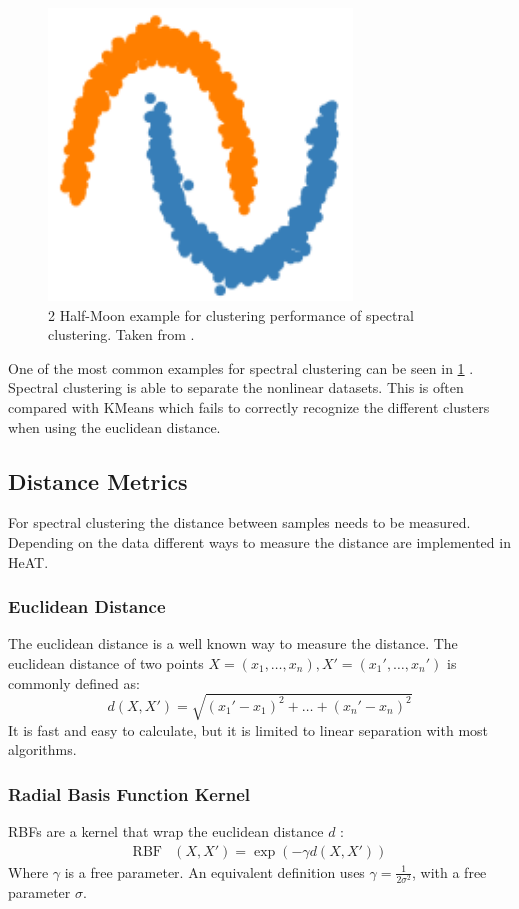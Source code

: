 \begin{figure}
  \includegraphics{images/spectral_example.png}
  \caption{2 Half-Moon example for clustering performance of spectral clustering. Taken from \cite{noauthor_23_2020}.}
  \label{fig:spectral_example}
\end{figure}

One of the most common examples for spectral clustering can be seen in \cref{fig:spectral_example} \cite{noauthor_23_2020}. Spectral clustering is able to
separate the nonlinear datasets. This is often compared with KMeans which fails to correctly recognize the different clusters when using the euclidean distance.

\subsection{Distance Metrics}
\label{subsec:distance_metrics}
For spectral clustering the distance between samples needs to be measured. Depending on the data different ways to measure the distance are implemented in \gls{HeAT}.

\subsubsection{Euclidean Distance}
The euclidean distance is a well known way to measure the distance. The euclidean distance of two points \(X = (x_1, \ldots, x_n ), X' = (x_1', \ldots, x_n')\) is commonly defined  as:
\[
  d\left(X, X'\right) = \sqrt{{(x_1' - x_1)}^2 + \ldots + {(x_n' - x_n)}^2}
\]
It is fast and easy to calculate, but it is limited to  linear separation with most algorithms.

\subsubsection{Radial Basis Function Kernel}
\glspl{RBF} are a kernel that wrap the euclidean distance \(d\) \cite{vert_primer_2004}:
\begin{align*}
  \mathop{RBF} & \left(X, X'\right) = \exp(-\gamma d(X, X'))
\end{align*}
Where \(\gamma\) is a free parameter. An equivalent definition uses \(\gamma = \frac{1}{2\sigma^2}\), with a free parameter \(\sigma\).

